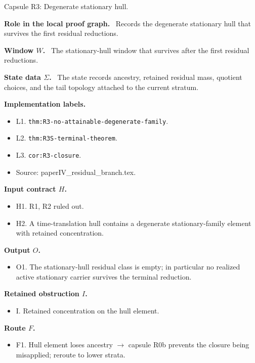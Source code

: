 \documentclass[11pt]{amsart}
\newcommand{\capsulefield}[1]{\par\smallskip\noindent\textbf{#1.}\ }
\begin{document}
\begin{proofcapsule}{Capsule R3: Degenerate stationary hull.}
  \capsulefield{Role in the local proof graph}
  Records the degenerate stationary hull that survives the first residual reductions.

  \capsulefield{Window \(W\)}
The stationary-hull window that survives after the first residual reductions.

  \capsulefield{State data \(\Sigma\)}
The state records ancestry, retained residual mass, quotient choices, and the tail topology attached to the current stratum.

  \capsulefield{Implementation labels}
  \begin{itemize}[leftmargin=1.8em]
  \item L1. \texttt{thm:R3-no-attainable-degenerate-family}.
  \item L2. \texttt{thm:R3S-terminal-theorem}.
  \item L3. \texttt{cor:R3-closure}.
  \item Source: paperIV\_residual\_branch.tex.
  \end{itemize}

  \capsulefield{Input contract \(H\)}
  \begin{itemize}[leftmargin=1.8em]
  \item H1. R1, R2 ruled out.
  \item H2. A time-translation hull contains a degenerate stationary-family element with retained concentration.
  \end{itemize}

  \capsulefield{Output \(O\)}
  \begin{itemize}[leftmargin=1.8em]
  \item O1. The stationary-hull residual class is empty; in particular no realized active stationary carrier survives the terminal reduction.
  \end{itemize}

  \capsulefield{Retained obstruction \(I\)}
  \begin{itemize}[leftmargin=1.8em]
  \item I. Retained concentration on the hull element.
  \end{itemize}

  \capsulefield{Route \(F\)}
  \begin{itemize}[leftmargin=1.8em]
  \item F1. Hull element loses ancestry $\to$ capsule R0b prevents the closure being misapplied; reroute to lower strata.
  \end{itemize}


\end{proofcapsule}
\end{document}
